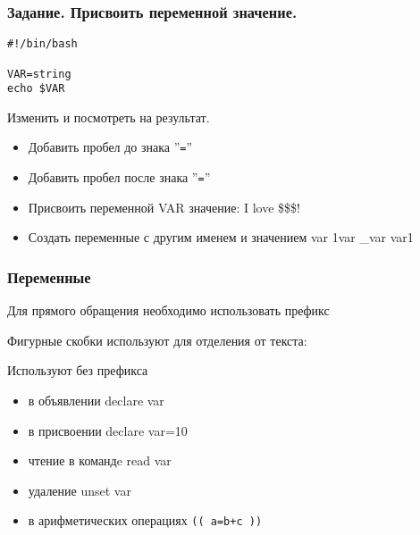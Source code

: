 
\begin{frame}[fragile]
	\frametitle{Задание. Присвоить переменной значение.}

\begin{lstlisting}
#!/bin/bash

VAR=string
echo $VAR
\end{lstlisting}

	\begin{block}{Изменить и посмотреть на результат.}
		\begin{itemize}
			\item Добавить пробел до знака ''{\tt =}''
			\item Добавить пробел после знака ''{\tt =}''
			\item Присвоить переменной VAR значение: I love \$\$\$!
			\item Создать переменные с другим именем и значением var 1var \_var var1
		\end{itemize}
	\end{block}

\end{frame}

\begin{frame}
	\frametitle{Переменные}
	\large{}

	Для прямого обращения необходимо использовать префикс \\
	\center{\Large{\tt \$}}

	Фигурные скобки используют для отделения от текста:\\

	
	\begin{alertblock}{Используют без префикса}
		\begin{itemize}
			\item в объявлении declare var
			\item в присвоении declare var=10
			\item чтение в командe read var
			\item удаление unset var
			\item в арифметических операциях {\tt (( a=b+c ))}
		\end{itemize}
	\end{alertblock}
\end{frame}


%
%
%


